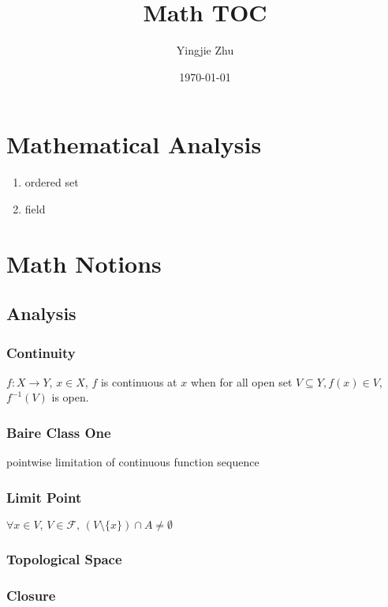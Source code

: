 \documentclass[11pt,a4paper]{article}
\title{Math TOC}
\author{Yingjie Zhu}
\date{\today}
\begin{document}
\maketitle
\tableofcontents

\section{Mathematical Analysis}

\begin{enumerate}
    \item ordered set
    \item field
\end{enumerate}

\section{Math Notions}

\subsection{Analysis}

\subsubsection{Continuity}

$f: X \to Y,\, x \in X$, $f$ is continuous at $x$ when for all open set $V \subseteq Y, f(x) \in V$, $f^{-1}(V)$ is open.

\subsubsection{Baire Class One}

pointwise limitation of continuous function sequence

\subsubsection{Limit Point}

$\forall x \in V,\, V \in \mathcal{F},\, \left( V \setminus \{ x\} \right) \cap A \ne \emptyset$

\subsubsection{Topological Space}

\subsubsection{Closure}
\end{document}
